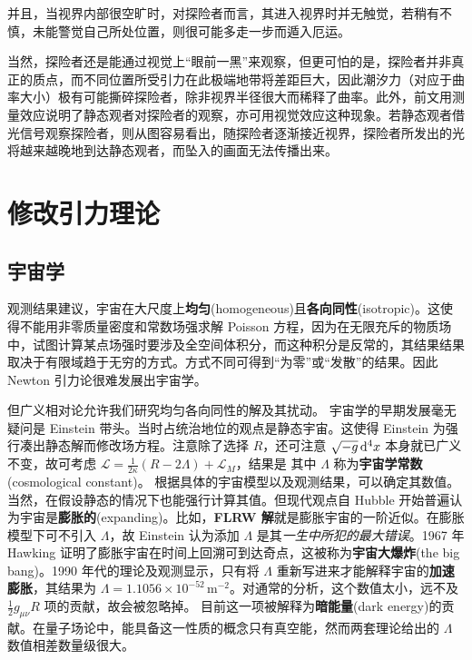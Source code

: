 并且，当视界内部很空旷时，对探险者而言，其进入视界时并无触觉，若稍有不慎，未能警觉自己所处位置，则很可能多走一步而遁入厄运。

当然，探险者还是能通过视觉上“眼前一黑”来观察，但更可怕的是，探险者并非真正的质点，而不同位置所受引力在此极端地带将差距巨大，因此潮汐力（对应于曲率大小）极有可能撕碎探险者，除非视界半径很大而稀释了曲率。此外，前文用测量效应说明了静态观者对探险者的观察，亦可用视觉效应这种现象。若静态观者借光信号观察探险者，则从图容易看出，随探险者逐渐接近视界，探险者所发出的光将越来越晚地到达静态观者，而坠入的画面无法传播出来。


\section{修改引力理论}
\subsection{宇宙学}
观测结果建议，宇宙在大尺度上\textbf{均匀}(homogeneous)且\textbf{各向同性}(isotropic)。这使得不能用非零质量密度和常数场强求解 Poisson 方程，因为在无限充斥的物质场中，试图计算某点场强时要涉及全空间体积分，而这种积分是反常的，其结果结果取决于有限域趋于无穷的方式。方式不同可得到“为零”或“发散”的结果。因此 Newton 引力论很难发展出宇宙学。

但广义相对论允许我们研究均匀各向同性的解及其扰动。
宇宙学的早期发展毫无疑问是 Einstein 带头。当时占统治地位的观点是静态宇宙。这使得 Einstein 为强行凑出静态解而修改场方程。注意除了选择 $R$，还可注意 $\sqrt{-g}\dd[4]{x}$ 本身就已广义不变，故可考虑 $\mathcal L=\frac{1}{2\kappa}\left(R-2\Lambda\right)+\mathcal L_M$，结果是
其中 $\Lambda$ 称为\textbf{宇宙学常数}(cosmological constant)。
根据具体的宇宙模型以及观测结果，可以确定其数值。
当然，在假设静态的情况下也能强行计算其值。但现代观点自 Hubble 开始普遍认为宇宙是\textbf{膨胀的}(expanding)。比如，\textbf{FLRW 解}就是膨胀宇宙的一阶近似。在膨胀模型下可不引入 $\Lambda$，故 Einstein 认为添加 $\Lambda$ 是其\textit{一生中所犯的最大错误}。1967 年 Hawking 证明了膨胀宇宙在时间上回溯可到达奇点，这被称为\textbf{宇宙大爆炸}(the big bang)。1990 年代的理论及观测显示，只有将 $\Lambda$ 重新写进来才能解释宇宙的\textbf{加速膨胀}，其结果为 $\Lambda=1.1056\times 10^{-52}$\,m$^{-2}$。对通常的分析，这个数值太小，远不及 $\frac12 g_{\mu\nu} R$ 项的贡献，故会被忽略掉。
目前这一项被解释为\textbf{暗能量}(dark energy)的贡献。在量子场论中，能具备这一性质的概念只有真空能，然而两套理论给出的 $\Lambda$ 数值相差数量级很大。

